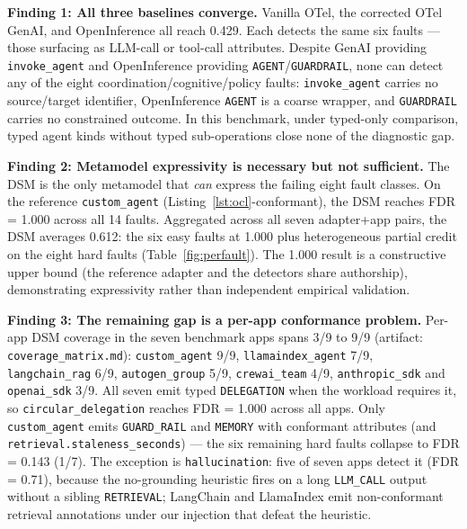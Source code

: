 \documentclass[sigconf,nonacm]{acmart}
\begin{document}
\textbf{Finding 1: All three baselines converge.} Vanilla OTel, the corrected OTel GenAI, and OpenInference all reach 0.429. Each detects the same six faults --- those surfacing as LLM-call or tool-call attributes. Despite GenAI providing \texttt{invoke\_agent} and OpenInference providing \texttt{AGENT}/\texttt{GUARDRAIL}, none can detect any of the eight coordination/cognitive/policy faults: \texttt{invoke\_agent} carries no source/target identifier, OpenInference \texttt{AGENT} is a coarse wrapper, and \texttt{GUARDRAIL} carries no constrained outcome. In this benchmark, under typed-only comparison, typed agent kinds without typed sub-operations close none of the diagnostic gap.

\textbf{Finding 2: Metamodel expressivity is necessary but not sufficient.} The DSM is the only metamodel that \emph{can} express the failing eight fault classes. On the reference \texttt{custom\_agent} (Listing~\ref{lst:ocl}-conformant), the DSM reaches FDR = 1.000 across all 14 faults. Aggregated across all seven adapter+app pairs, the DSM averages 0.612: the six easy faults at 1.000 plus heterogeneous partial credit on the eight hard faults (Table~\ref{fig:perfault}). The 1.000 result is a constructive upper bound (the reference adapter and the detectors share authorship), demonstrating expressivity rather than independent empirical validation.

\textbf{Finding 3: The remaining gap is a per-app conformance problem.} Per-app DSM coverage in the seven benchmark apps spans 3/9 to 9/9 (artifact: \texttt{coverage\_matrix.md}): \texttt{custom\_}\-\texttt{agent} 9/9, \texttt{llamaindex\_}\-\texttt{agent} 7/9, \texttt{langchain\_}\-\texttt{rag} 6/9, \texttt{autogen\_}\-\texttt{group} 5/9, \texttt{crewai\_}\-\texttt{team} 4/9, \texttt{anthropic\_}\-\texttt{sdk} and \texttt{openai\_}\-\texttt{sdk} 3/9. All seven emit typed \texttt{DELEGATION} when the workload requires it, so \texttt{circular\_}\-\texttt{delegation} reaches FDR = 1.000 across all apps. Only \texttt{custom\_}\-\texttt{agent} emits \texttt{GUARD\_RAIL} and \texttt{MEMORY} with conformant attributes (and \texttt{retrieval.staleness\_seconds}) --- the six remaining hard faults collapse to FDR = 0.143 (1/7). The exception is \texttt{hallucination}: five of seven apps detect it (FDR = 0.71), because the no-grounding heuristic fires on a long \texttt{LLM\_CALL} output without a sibling \texttt{RETRIEVAL}; LangChain and LlamaIndex emit non-conformant retrieval annotations under our injection that defeat the heuristic.
\end{document}
